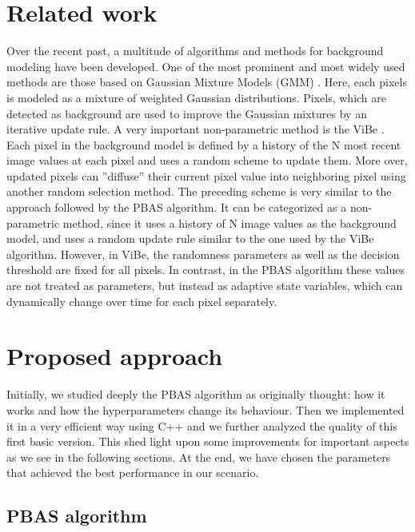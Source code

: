 \section*{Related work}
Over the recent past, a multitude of algorithms and methods for background modeling have been developed.
One of the most prominent and most widely used methods are those based on Gaussian Mixture Models (GMM) \cite{gmm}. Here, each pixels is modeled as a mixture of weighted Gaussian distributions. Pixels, which are detected as background are used to improve the Gaussian mixtures by an iterative update rule. A very important non-parametric method is the ViBe \cite{vibe}. Each pixel in the background model is defined by a history of the N most recent image values at each pixel and uses a random scheme to update them.
More over, updated pixels can ”diffuse” their current pixel value into neighboring pixel using another random selection method. The preceding scheme is very similar to the approach followed by the PBAS algorithm.
It can be categorized as a non-parametric method, since it uses a history of N image values as the background model, and uses a random update rule similar to the one used by the ViBe algorithm. However, in ViBe, the randomness parameters as well as the decision threshold are fixed for all pixels. In contrast, in the PBAS algorithm these values are not treated as parameters, but instead as adaptive state variables, which can dynamically change over time for each pixel separately.


\section*{Proposed approach}
Initially, we studied deeply the PBAS algorithm as originally thought: how it works and how the hyperparameters change its behaviour. Then we implemented it in a very efficient way using C++ and we further analyzed the quality of this first basic version. This shed light upon some improvements for important aspects as we see in the following sections.
At the end, we have chosen the parameters that achieved the best performance in our scenario.

\subsection{PBAS algorithm} \label{subsect:PBAS}

